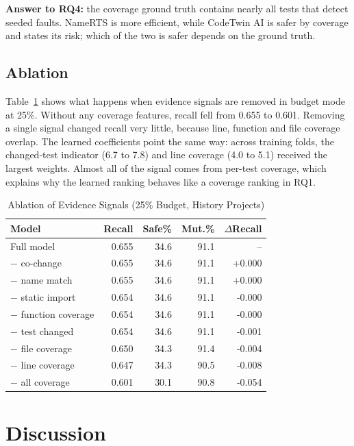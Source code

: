 \documentclass[conference]{IEEEtran}
\begin{document}
\textbf{Answer to RQ4:} the coverage ground truth contains nearly all tests that detect seeded faults. NameRTS is more efficient, while CodeTwin AI is safer by coverage and states its risk; which of the two is safer depends on the ground truth.

\subsection{Ablation}\label{sec:ablation}
Table~\ref{tab:ablation} shows what happens when evidence signals are removed in budget mode at 25\%. Without any coverage features, recall fell from 0.655 to 0.601. Removing a single signal changed recall very little, because line, function and file coverage overlap. The learned coefficients point the same way: across training folds, the changed-test indicator (6.7 to 7.8) and line coverage (4.0 to 5.1) received the largest weights. Almost all of the signal comes from per-test coverage, which explains why the learned ranking behaves like a coverage ranking in RQ1.

\begin{table}[t]
\caption{Ablation of Evidence Signals (25\% Budget, History Projects)}
\label{tab:ablation}
\centering
\footnotesize
\begin{tabular}{@{}lrrrr@{}}
\toprule
\textbf{Model} & \textbf{Recall} & \textbf{Safe\%} & \textbf{Mut.\%} & \textbf{$\Delta$Recall} \\
\midrule
Full model & 0.655 & 34.6 & 91.1 & -- \\
$-$ co-change & 0.655 & 34.6 & 91.1 & +0.000 \\
$-$ name match & 0.655 & 34.6 & 91.1 & +0.000 \\
$-$ static import & 0.654 & 34.6 & 91.1 & -0.000 \\
$-$ function coverage & 0.654 & 34.6 & 91.1 & -0.000 \\
$-$ test changed & 0.654 & 34.6 & 91.1 & -0.001 \\
$-$ file coverage & 0.650 & 34.3 & 91.4 & -0.004 \\
$-$ line coverage & 0.647 & 34.3 & 90.5 & -0.008 \\
$-$ all coverage & 0.601 & 30.1 & 90.8 & -0.054 \\
\bottomrule
\end{tabular}
\end{table}

\section{Discussion}\label{sec:discussion}
\end{document}
